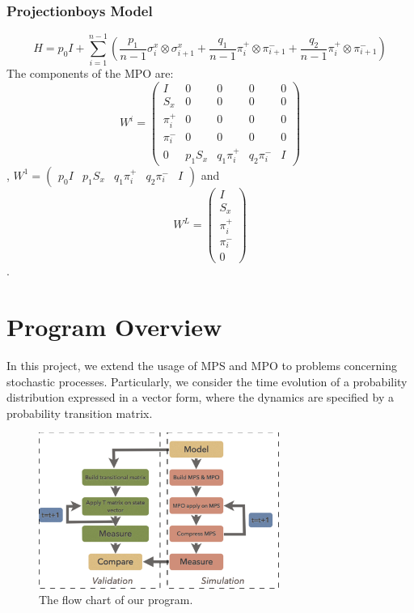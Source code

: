 \documentclass[english]{article}
\begin{document}
\subsubsection{Projectionboys Model}
\begin{displaymath}
H = p_0 I +  \sum_{i=1}^{n-1}(\frac{p_1}{n-1}\sigma_i^x\otimes\sigma_{i+1}^x + \frac{q_1}{n-1}\pi_i^+\otimes\pi_{i+1}^- + \frac{q_2}{n-1}\pi_i^+\otimes\pi_{i+1}^-)
\end{displaymath}
The components of the MPO are:
$$W^{i}=
\begin{pmatrix}
I & 0 & 0 & 0 & 0 \\
S_x & 0 & 0  & 0 & 0 \\
\pi_i^+ & 0 & 0  & 0 & 0 \\
\pi_i^- & 0 & 0  & 0 & 0 \\
0 & p_1 S_x & q_1 \pi_i^+  & q_2 \pi_i^- & I
\end{pmatrix}$$,
$W^1=\begin{pmatrix}p_0 I & p_1 S_x & q_1 \pi_i^+ & q_2 \pi_i^- & I\end{pmatrix}$ and
$$W^L=
\begin{pmatrix}
I \\ S_x \\ \pi_i^+ \\ \pi_i^- \\ 0
\end{pmatrix}$$.

\section{Program Overview}
In this project, we extend the usage of MPS and MPO to problems concerning stochastic processes. Particularly, we  consider the time evolution of a probability distribution expressed in a vector form, where the dynamics are specified by a probability transition matrix.

\begin{figure}[htbp]
\begin{center}
\includegraphics[width=0.7\textwidth]{flow_chart_new.pdf}
\caption{The flow chart of our program.}
\label{fig:flow_chart}
\end{center}
\end{figure}
\end{document}
